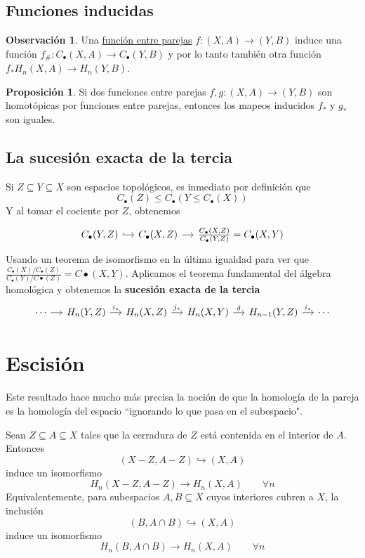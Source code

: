 \documentclass[spanish]{book}
\theoremstyle{definition}
\newtheorem*{obs}{Observación}
\newtheorem*{prop}{Proposición}
\begin{document}
\subsection{Funciones inducidas}
	\begin{obs}
		Una \hyperref[def:func-homot]{función entre parejas} $f:(X,A)\to(Y,B)$ induce una función $f_\#:C_\bullet(X,A)\to C_\bullet(Y,B)$ y por lo tanto también otra función $f_*H_n(X,A)\to H_n(Y,B)$.
	\end{obs}
	\begin{prop}
		Si dos funciones entre parejas $f,g:(X,A)\to(Y,B)$ son homotópicas por funciones entre parejas, entonces los mapeos inducidos $f_*$ y $g_*$ son iguales.
	\end{prop}
\subsection{La sucesión exacta de la tercia}
	Si $Z\subseteq Y\subseteq X$ son espacios topológicos, es inmediato por definición que
	\[C_\bullet(Z)\leq C_\bullet(Y\leq C_\bullet(X))\]
	Y al tomar el cociente por $Z$, obtenemos 
	\[\begin{tikzcd}[column sep=small]
		C_\bullet(Y,Z)\arrow[r,hook]&C_\bullet(X,Z)\arrow[r]&\frac{C_\bullet(X,Z)}{C_\bullet(Y,Z)}=C_\bullet(X,Y)
	\end{tikzcd}\]
	Usando un teorema de isomorfismo en la última igualdad para ver que $\frac{C_\bullet(X)/C_\bullet(Z)}{C_\bullet(Y)/C\bullet(Z)}=C\bullet(X,Y)$. Aplicamos el teorema fundamental del álgebra homológica y obtenemos la \textbf{sucesión exacta de la tercia}
	\[\begin{tikzcd}[column sep=small]
		\cdots\arrow[r]&H_n(Y,Z)\arrow[r,"i_*"]&H_n(X,Z)\arrow[r,"j_*"]&H_n(X,Y)\arrow[r,"\delta"]&H_{n-1}(Y,Z)\arrow[r,"i_*"]&\cdots
	\end{tikzcd}\]
\section{Escisión}\label{sec:escisión}
Este resultado hace mucho más precisa la noción de que la homología de la pareja es la homología del espacio ``ignorando lo que pasa en el subespacio".

Sean $Z\subseteq A\subseteq X$ tales que la cerradura de $Z$ está contenida en el interior de $A$. Entonces
\[(X-Z,A-Z)\hookrightarrow (X,A)\]
induce un isomorfismo
\[H_n(X-Z,A-Z)\to H_n(X,A)\qquad\forall n\]
Equivalentemente, para subespacios $A,B\subseteq X$ cuyos interiores cubren a $X$, la inclusión
\[(B,A\cap B)\hookrightarrow (X,A)\]
induce un isomorfismo
\[H_n(B,A\cap B)\to H_n(X,A)\qquad\forall n\]
\end{document}
